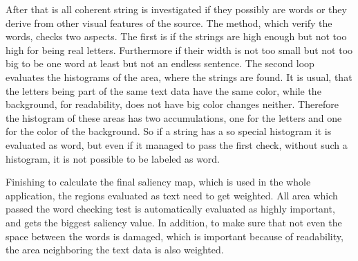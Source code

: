 \documentclass[draft,final]{vutinfth} %
\begin{document}
After that is all coherent string is investigated if they possibly are words or they derive from other visual features of the source.
The method, which verify the words, checks two aspects.
The first is if the strings are high enough but not too high for being real letters.
Furthermore if their width is not too small but not too big to be one word at least but not an endless sentence.
The second loop evaluates the histograms of the area, where the strings are found.
It is usual, that the letters being part of the same text data have the same color, while the background, for readability, does not have big color changes neither.
Therefore the histogram of these areas has two accumulations, one for the letters and one for the color of the background.
So if a string has a so special histogram it is evaluated as word, but even if it managed to pass the first check, without such a histogram, it is not possible to be labeled as word. \par 
Finishing to calculate the final saliency map, which is used in the whole application, the regions evaluated as text need to get weighted.
All area which passed the word checking test is automatically evaluated as highly important, and gets the biggest saliency value.
In addition, to make sure that not even the space between the words is damaged, which is important because of readability, the area neighboring the text data is also weighted.
\end{document}

